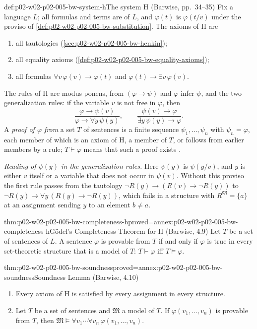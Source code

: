 \begin{hbdefinition}{def:p02-w02-p02-005-bw-system-h}{The system H (Barwise, pp.~34--35)}
Fix a language \(L\); all formulas and terms are of \(L\), and
\(\varphi(t)\) is \(\varphi(t/v)\) under the proviso of
\cref{def:p02-w02-p02-005-bw-substitution}.  The axioms of H are
\begin{enumerate}
\item all tautologies (\cref{sec:p02-w02-p02-005-bw-henkin});
\item all equality axioms (\cref{def:p02-w02-p02-005-bw-equality-axioms});
\item all formulas \(\forall v\,\varphi(v)\to\varphi(t)\) and
      \(\varphi(t)\to\exists v\,\varphi(v)\).
\end{enumerate}
The rules of H are modus ponens, from \((\varphi\to\psi)\) and \(\varphi\)
infer \(\psi\), and the two generalization rules: if the variable \(v\) is
not free in \(\varphi\), then
\[
\frac{\varphi\to\psi(v)}{\varphi\to\forall y\,\psi(y)},\qquad
\frac{\psi(v)\to\varphi}{\exists y\,\psi(y)\to\varphi}.
\]
A \emph{proof of \(\varphi\) from} a set \(T\) of sentences is a finite
sequence \(\psi_1,\ldots,\psi_n\) with \(\psi_n=\varphi\), each member of
which is an axiom of H, a member of \(T\), or follows from earlier members
by a rule; \(T\vdash\varphi\) means that such a proof exists
\cite[ch.~A.1, \S4, pp.~34--35]{Barwise1977FirstOrder}.

\emph{Reading of \(\psi(y)\) in the generalization rules.}  Here
\(\psi(y)\) is \(\psi(y/v)\), and \(y\) is either \(v\) itself or a
variable that does not occur in \(\psi(v)\).  Without this proviso the
first rule passes from the tautology
\(\neg R(y)\to(R(v)\to\neg R(y))\) to
\(\neg R(y)\to\forall y\,(R(y)\to\neg R(y))\), which fails in a structure
with \(R^{\mathfrak M}=\{a\}\) at an assignment sending \(y\) to an element
\(b\neq a\).
\end{hbdefinition}

\begin{hbtheorem}{thm:p02-w02-p02-005-bw-completeness-h}{proved=annex:p02-w02-p02-005-bw-completeness-h}{G\"odel's Completeness Theorem for H (Barwise, 4.9)}
Let \(T\) be a set of sentences of \(L\).  A sentence \(\varphi\) is
provable from \(T\) if and only if \(\varphi\) is true in every
set-theoretic structure that is a model of \(T\): \(T\vdash\varphi\) iff
\(T\models\varphi\).
\end{hbtheorem}

\begin{hblemma}{thm:p02-w02-p02-005-bw-soundness}{proved=annex:p02-w02-p02-005-bw-soundness}{Soundness Lemma (Barwise, 4.10)}
\begin{enumerate}
\item Every axiom of H is satisfied by every assignment in every structure.
\item Let \(T\) be a set of sentences and \(\mathfrak M\) a model of \(T\).
      If \(\varphi(v_1,\ldots,v_n)\) is provable from \(T\), then
      \(\mathfrak M\models\forall v_1\cdots\forall v_n\,\varphi(v_1,\ldots,v_n)\).
\end{enumerate}
\end{hblemma}

